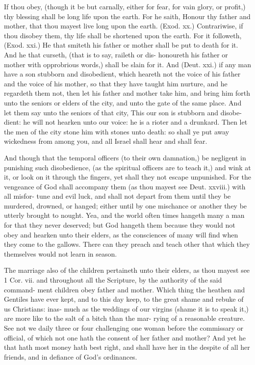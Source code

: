 \documentclass{custom}
\begin{document}
If thou obey, (though it be but carnally, either for fear,
for vain glory, or profit,) thy blessing shall be long life 
upon the earth. For he saith, Honour thy father and 
mother, that thou mayest live long upon the earth. (Exod. 
xx.) Contrariwise, if thou disobey them, thy life shall 
be shortened upon the earth. For it followeth, (Exod. xxi.) 
He that smiteth his father or mother shall be put to death 
for it. And he that curseth, (that is to say, raileth or dis- 
honoureth his father or mother with opprobrious words,) 
shall be slain for it. And (Deut. xxi.) if any man have 
a son stubborn and disobedient, which heareth not the 
voice of his father and the voice of his mother, so that 
they have taught him nurture, and he regardeth them not, 
then let his father and mother take him, and bring him 
forth unto the seniors or elders of the city, and unto the 
gate of the same place. And let them say unto the 
seniors of that city, This our son is stubborn and disobe- 
dient: he will not hearken unto our voice: he is a rioter 
and a drunkard. Then let the men of the city stone him 
with stones unto death: so shall ye put away wickedness
from among you, and all Israel shall hear and shall fear. 

And though that the temporal officers (to their own 
damnation,) be negligent in punishing such disobedience, 
(as the spiritual officers are to teach it,) and wink at it, 
or look on it through the fingers, yet shall they not escape 
unpunished. For the vengeance of God shall accompany 
them (as thou mayest see Deut. xxviii.) with all misfor- 
tune and evil luck, and shall not depart from them until 
they be murdered, drowned, or hanged; either until by 
one mischance or another they be utterly brought to 
nought. Yea, and the world often times hangeth many a 
man for that they never deserved; but God hangeth them 
because they would not obey and hearken unto their 
elders, as the consciences of many will find when they 
come to the gallows. There can they preach and teach 
other that which they themselves would not learn in 
season. 

The marriage also of the children pertaineth unto their 
elders, as thou mayest see 1 Cor. vii. and throughout all 
the Scripture, by the authority of the said command- 
ment children obey father and mother. Which thing the 
heathen and Gentiles have ever kept, and to this day keep, 
to the great shame and rebuke of us Christians: inas- 
much as the weddings of our virgins (shame it is to speak 
it,) are more like to the salt of a bitch than the mar- 
rying of a reasonable creature. See not we daily three or 
four challenging one woman before the commissary or 
official, of which not one hath the consent of her father and 
mother? And yet he that hath most money hath best 
right, and shall have her in the despite of all her friends, 
and in defiance of God's ordinances. 
\end{document}
